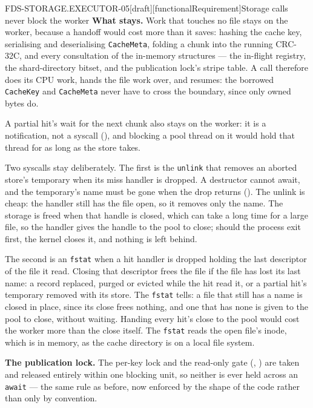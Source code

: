 \begin{requirement}{FDS-STORAGE.EXECUTOR-05}[draft][functionalRequirement]{Storage calls never block the worker}
  \textbf{What stays.} Work that touches no file stays on the worker, because
  a handoff would cost more than it saves: hashing the cache key, serialising
  and deserialising \texttt{CacheMeta}, folding a chunk into the running
  CRC-32C, and every consultation of the in-memory structures --- the
  in-flight registry, the shard-directory bitset, and the publication lock's
  stripe table. A call therefore does its CPU work, hands the file work over,
  and resumes: the borrowed \texttt{CacheKey} and \texttt{CacheMeta} never
  have to cross the boundary, since only owned bytes do.

  A partial hit's wait for the next chunk also stays on the worker: it is a
  notification, not a syscall (), and blocking
  a pool thread on it would hold that thread for as long as the store takes.

  Two syscalls stay deliberately. The first is the \texttt{unlink} that
  removes an aborted store's temporary when its miss handler is dropped. A destructor
  cannot await, and the temporary's name must be gone when the drop returns
  (). The unlink is cheap: the handler still
  has the file open, so it removes only the name. The storage is freed when
  that handle is closed, which can take a long time for a large file, so
  the handler gives the handle to the pool to close; should the process
  exit first, the kernel closes it, and nothing is left behind.

  The second is an \texttt{fstat} when a hit handler is dropped holding the
  last descriptor of the file it read. Closing that descriptor frees the
  file if the file has lost its last name: a record replaced, purged or
  evicted while the hit read it, or a partial hit's temporary removed with
  its store. The \texttt{fstat} tells: a file that still has a name is
  closed in place, since its close frees nothing, and one that has none is
  given to the pool to close, without waiting. Handing every hit's close to
  the pool would cost the worker more than the close itself. The
  \texttt{fstat} reads the open file's inode, which is in memory, as the
  cache directory is on a local file system.

  \textbf{The publication lock.} The per-key lock and the read-only gate
  (, ) are
  taken and released entirely within one blocking unit, so neither is ever
  held across an \texttt{await} --- the same rule as before, now enforced by
  the shape of the code rather than only by convention.


\end{requirement}
